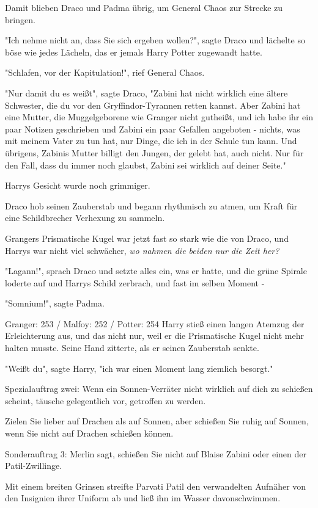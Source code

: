 {Damit blieben Draco und Padma übrig, um General Chaos zur Strecke zu bringen.

"Ich nehme nicht an, dass Sie sich ergeben wollen?", sagte Draco und lächelte so böse wie jedes Lächeln, das er jemals Harry Potter zugewandt hatte.

"Schlafen, vor der Kapitulation!", rief General Chaos.

"Nur damit du es weißt", sagte Draco, "Zabini hat nicht wirklich eine ältere Schwester, die du vor den Gryffindor-Tyrannen retten kannst. Aber Zabini hat eine Mutter, die Muggelgeborene wie Granger nicht gutheißt, und ich habe ihr ein paar Notizen geschrieben und Zabini ein paar Gefallen angeboten - nichts, was mit meinem Vater zu tun hat, nur Dinge, die ich in der Schule tun kann. Und übrigens, Zabinis Mutter billigt den Jungen, der gelebt hat, auch nicht. Nur für den Fall, dass du immer noch glaubst, Zabini sei wirklich auf deiner Seite."

Harrys Gesicht wurde noch grimmiger.

Draco hob seinen Zauberstab und begann rhythmisch zu atmen, um Kraft für eine Schildbrecher Verhexung zu sammeln.

Grangers Prismatische Kugel war jetzt fast so stark wie die von Draco, und Harrys war nicht viel schwächer, \emph{wo nahmen die beiden nur die Zeit her?}

"Lagann!", sprach Draco und setzte alles ein, was er hatte, und die grüne Spirale loderte auf und Harrys Schild zerbrach, und fast im selben Moment -

"Somnium!", sagte Padma.

Granger: 253 / Malfoy: 252 / Potter: 254 Harry stieß einen langen Atemzug der Erleichterung aus, und das nicht nur, weil er die Prismatische Kugel nicht mehr halten musste. Seine Hand zitterte, als er seinen Zauberstab senkte.

"Weißt du", sagte Harry, "ich war einen Moment lang ziemlich besorgt."

Spezialauftrag zwei: Wenn ein Sonnen-Verräter nicht wirklich auf dich zu schießen scheint, täusche gelegentlich vor, getroffen zu werden.

Zielen Sie lieber auf Drachen als auf Sonnen, aber schießen Sie ruhig auf Sonnen, wenn Sie nicht auf Drachen schießen können.

Sonderauftrag 3: Merlin sagt, schießen Sie nicht auf Blaise Zabini oder einen der Patil-Zwillinge.

Mit einem breiten Grinsen streifte Parvati Patil den verwandelten Aufnäher von den Insignien ihrer Uniform ab und ließ ihn im Wasser davonschwimmen.

}
